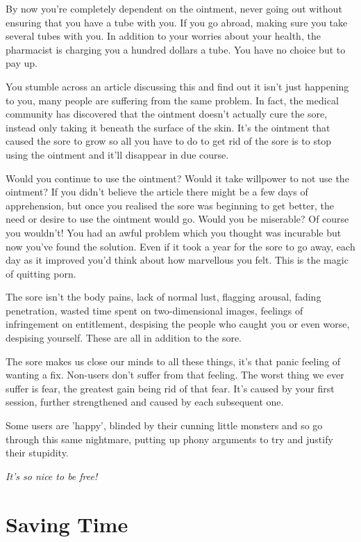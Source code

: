 \documentclass[
]{book}
\begin{document}
By now you're completely dependent on the ointment, never going out without ensuring that you have a tube with you. If you go abroad, making sure you take several tubes with you. In addition to your worries about your health, the pharmacist is charging you a hundred dollars a tube. You have no choice but to pay up.

You stumble across an article discussing this and find out it isn't just happening to you, many people are suffering from the same problem. In fact, the medical community has discovered that the ointment doesn't actually cure the sore, instead only taking it beneath the surface of the skin. It's the ointment that caused the sore to grow so all you have to do to get rid of the sore is to stop using the ointment and it'll disappear in due course.

Would you continue to use the ointment? Would it take willpower to not use the ointment? If you didn't believe the article there might be a few days of apprehension, but once you realised the sore was beginning to get better, the need or desire to use the ointment would go. Would you be miserable? Of course you wouldn't! You had an awful problem which you thought was incurable but now you've found the solution. Even if it took a year for the sore to go away, each day as it improved you'd think about how marvellous you felt. This is the magic of quitting porn.

The sore isn't the body pains, lack of normal lust, flagging arousal, fading penetration, wasted time spent on two-dimensional images, feelings of infringement on entitlement, despising the people who caught you or even worse, despising yourself. These are all in addition to the sore.

The sore makes us close our minds to all these things, it's that panic feeling of wanting a fix. Non-users don't suffer from that feeling. The worst thing we ever suffer is fear, the greatest gain being rid of that fear. It's caused by your first session, further strengthened and caused by each subsequent one.

Some users are 'happy', blinded by their cunning little monsters and so go through this same nightmare, putting up phony arguments to try and justify their stupidity.

\emph{It's so nice to be free!}

\hypertarget{saving-time}{%
\chapter{Saving Time}\label{saving-time}}
\end{document}
